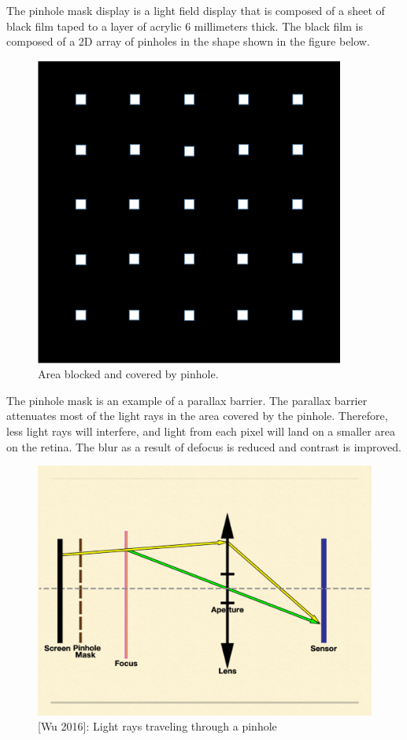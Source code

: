 The pinhole mask display is a light field display that is composed of a sheet of black film taped to a layer of acrylic 6 millimeters thick. The black film is composed of a 2D array of pinholes in the shape shown in the figure below.

\begin{figure}[ht]
  \centering
  \includegraphics[width=4in]{chapters/chapter3/images/Pinhole_Mask2.png}
  \caption{Area blocked and covered by pinhole.}
  \label{fig:ferrari}
\end{figure}

The pinhole mask is an example of a parallax barrier. The parallax barrier attenuates most of the light rays in the area covered by the pinhole. Therefore, less light rays will interfere, and light from each pixel will land on a smaller area on the retina. The blur as a result of defocus is reduced and contrast is improved. 

\begin{figure}[ht]
  \centering
  \includegraphics[width=5.0in]{chapters/chapter3/images/pinhole_rays.png}
  \caption{[Wu 2016]: Light rays traveling through a pinhole}
  \label{fig:ferrari}
\end{figure}

